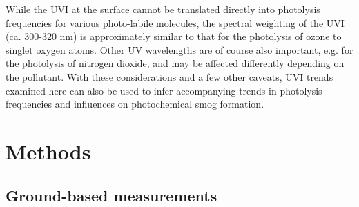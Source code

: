 \documentclass[10pt]{article}
\begin{document}
While the UVI at the surface cannot be translated directly into
photolysis frequencies for various photo-labile molecules, the spectral
weighting of the UVI (ca. 300-320 nm) is approximately similar to that
for the photolysis of ozone to singlet oxygen atoms. Other UV
wavelengths are of course also important, e.g. for the photolysis of
nitrogen dioxide, and may be affected differently depending on the
pollutant. With these considerations and a few other caveats, UVI trends
examined here can also be used to infer accompanying trends in
photolysis frequencies and influences on photochemical smog formation.

\section*{Methods}

 {\label{770133}}

\subsection*{Ground-based measurements}

{\label{220276}}
\end{document}
